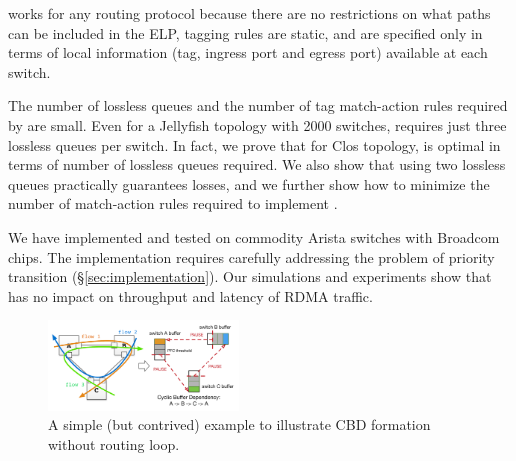 \sysname{} works for any routing protocol because there are no restrictions on
what paths can be included in the ELP, tagging rules are static, and are
specified only in terms of local information (tag, ingress port and egress port)
available at each switch.

The number of lossless queues and the number of tag match-action rules required
by \sysname{} are small.  Even for a Jellyfish topology with 2000 switches,
\sysname{} requires just three lossless queues per switch.  In fact, we prove
that for Clos topology,  \sysname{} is optimal in terms of number of lossless
queues required. We also show that using two lossless queues practically guarantees losses, 
and we further show how to minimize the number of match-action rules
required to implement \sysname{}.

We have implemented and tested \sysname{} on commodity Arista switches with Broadcom chips. 
The implementation requires carefully addressing the problem
of priority transition (\S\ref{sec:implementation}). Our simulations and experiments show that
\sysname{} has no impact on throughput and latency of RDMA traffic.

\begin{figure}[t]
		\centering
		\includegraphics[width=0.45\textwidth] {figs/deadlock}
		\vspace{-1em}
		\caption{A simple (but contrived) example to illustrate CBD formation
		without routing loop.}
		\vspace{-1em}
		\label{fig:basic_deadlock}
\end{figure}

